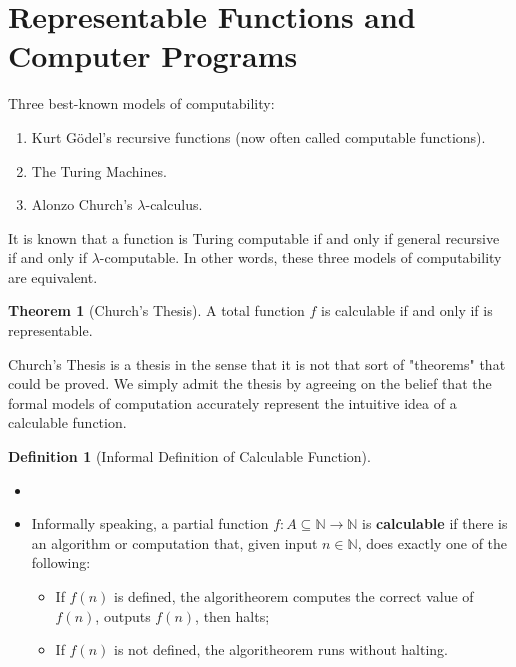 \documentclass[11pt,letterpaper]{book}
\theoremstyle{definition}
\newtheorem{definition}{Definition}[section]
\newtheorem{theorem}{Theorem}[section]
\begin{document}
\section{Representable Functions and Computer Programs}


Three best-known models of computability:
\begin{enumerate}
\item{Kurt G\"odel's recursive functions (now often called computable
functions).}
\item{The Turing Machines.}
\item{Alonzo Church's $\lambda$-calculus.}
\end{enumerate}

It is known that a function is Turing computable if and only if general
recursive if and only if $\lambda$-computable. In other words, these
three models of computability are equivalent.



\begin{theorem}[Church's Thesis]
\label{theorem:church_thesis_total_function}
A total function $f$ is calculable if and only if is representable.

\end{theorem}


Church's Thesis is a thesis in the sense that it is not that sort of
"theorems" that could be proved. We simply admit the thesis by agreeing
on the belief that the formal models of computation accurately represent
the intuitive idea of a calculable function.



\begin{definition}[Informal Definition of Calculable Function]
\begin{itemize}
\item[]
\item{Informally speaking, a partial function $f: A \subseteq
\mathbb{N}  \rightarrow \mathbb{N} $ is \textbf{calculable} if there is
an algorithm or computation that, given input $n \in \mathbb{N}$, does
exactly one of the following:
\begin{itemize}
\item{If $f(n)$ is defined, the algoritheorem computes the correct value
of $f(n)$, outputs $f(n)$, then halts;  }
\item{If $f(n)$ is not defined, the algoritheorem runs without halting.}
\end{itemize}
}
\end{itemize}
\end{definition}
\end{document}
